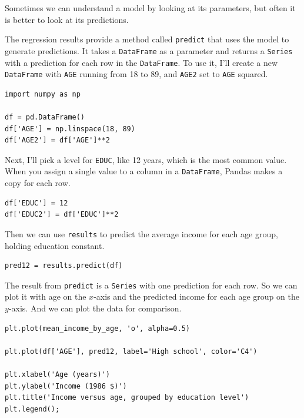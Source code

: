 Sometimes we can understand a model by looking at its parameters, but
often it is better to look at its predictions.

The regression results provide a method called
\passthrough{\lstinline!predict!} that uses the model to generate
predictions. It takes a \passthrough{\lstinline!DataFrame!} as a
parameter and returns a \passthrough{\lstinline!Series!} with a
prediction for each row in the \passthrough{\lstinline!DataFrame!}. To
use it, I'll create a new \passthrough{\lstinline!DataFrame!} with
\passthrough{\lstinline!AGE!} running from 18 to 89, and
\passthrough{\lstinline!AGE2!} set to \passthrough{\lstinline!AGE!}
squared.

\begin{lstlisting}[]
import numpy as np

df = pd.DataFrame()
df['AGE'] = np.linspace(18, 89)
df['AGE2'] = df['AGE']**2
\end{lstlisting}

Next, I'll pick a level for \passthrough{\lstinline!EDUC!}, like 12
years, which is the most common value. When you assign a single value to
a column in a \passthrough{\lstinline!DataFrame!}, Pandas makes a copy
for each row.

\begin{lstlisting}[]
df['EDUC'] = 12
df['EDUC2'] = df['EDUC']**2
\end{lstlisting}

Then we can use \passthrough{\lstinline!results!} to predict the average
income for each age group, holding education constant.

\begin{lstlisting}[]
pred12 = results.predict(df)
\end{lstlisting}

The result from \passthrough{\lstinline!predict!} is a
\passthrough{\lstinline!Series!} with one prediction for each row. So we
can plot it with age on the \(x\)-axis and the predicted income for each
age group on the \(y\)-axis. And we can plot the data for comparison.

\begin{lstlisting}[]
plt.plot(mean_income_by_age, 'o', alpha=0.5)

plt.plot(df['AGE'], pred12, label='High school', color='C4')

plt.xlabel('Age (years)')
plt.ylabel('Income (1986 $)')
plt.title('Income versus age, grouped by education level')
plt.legend();
\end{lstlisting}

